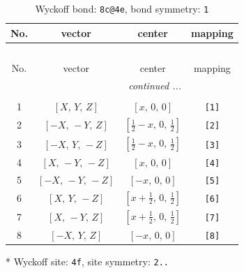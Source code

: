 \documentclass[fleqn,8pt]{jsarticle}
\begin{document}
\renewcommand{\arraystretch}{1.2}
\begin{longtable}{cccc}
\caption{Wyckoff bond: {\tt 8c@4e}, bond symmetry: {\tt 1}}
 \\
 \hline \hline
No. & vector & center & mapping \\ \hline \endfirsthead

\multicolumn{3}{l}{\tablename\ \thetable{}} \\
 \hline \hline
No. & vector & center & mapping \\ \hline \endhead

 \hline \hline
\multicolumn{3}{r}{\footnotesize\it continued ...} \\ \endfoot

 \hline \hline
\multicolumn{3}{r}{} \\ \endlastfoot

1 & $\left[ X,\, Y,\, Z \right]$ & $\left[ x,\, 0,\, 0 \right]$ & {\tt [1]} \\ \hline
2 & $\left[ - X,\, - Y,\, Z \right]$ & $\left[ \frac{1}{2} - x,\, 0,\, \frac{1}{2} \right]$ & {\tt [2]} \\ \hline
3 & $\left[ - X,\, Y,\, - Z \right]$ & $\left[ \frac{1}{2} - x,\, 0,\, \frac{1}{2} \right]$ & {\tt [3]} \\ \hline
4 & $\left[ X,\, - Y,\, - Z \right]$ & $\left[ x,\, 0,\, 0 \right]$ & {\tt [4]} \\ \hline
5 & $\left[ - X,\, - Y,\, - Z \right]$ & $\left[ - x,\, 0,\, 0 \right]$ & {\tt [5]} \\ \hline
6 & $\left[ X,\, Y,\, - Z \right]$ & $\left[ x + \frac{1}{2},\, 0,\, \frac{1}{2} \right]$ & {\tt [6]} \\ \hline
7 & $\left[ X,\, - Y,\, Z \right]$ & $\left[ x + \frac{1}{2},\, 0,\, \frac{1}{2} \right]$ & {\tt [7]} \\ \hline
8 & $\left[ - X,\, Y,\, Z \right]$ & $\left[ - x,\, 0,\, 0 \right]$ & {\tt [8]} \\
\end{longtable}
* Wyckoff site: {\tt 4f}, site symmetry: {\tt 2..}
\renewcommand{\arraystretch}{1.2}
\end{document}
